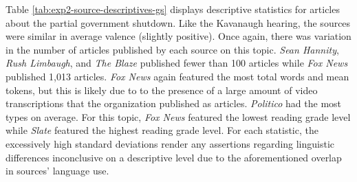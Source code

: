 \documentclass[
  man,floatsintext]{apa6}
\begin{document}
Table \ref{tab:exp2-source-descriptives-gs} displays descriptive
statistics for articles about the partial government shutdown. Like the
Kavanaugh hearing, the sources were similar in average valence (slightly
positive). Once again, there was variation in the number of articles
published by each source on this topic. \emph{Sean Hannity}, \emph{Rush Limbaugh},
and \emph{The Blaze} published fewer than 100 articles while \emph{Fox News}
published 1,013 articles. \emph{Fox News} again featured the most total words
and mean tokens, but this is likely due to to the presence of a large
amount of video transcriptions that the organization published as
articles. \emph{Politico} had the most types on average. For this topic, \emph{Fox
News} featured the lowest reading grade level while \emph{Slate} featured the
highest reading grade level. For each statistic, the excessively high
standard deviations render any assertions regarding linguistic
differences inconclusive on a descriptive level due to the
aforementioned overlap in sources' language use.
\end{document}
